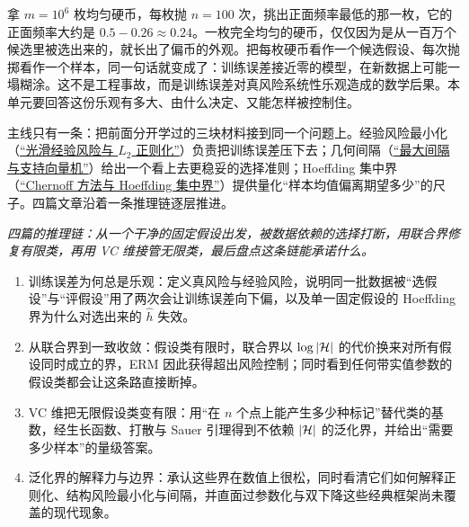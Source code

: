 拿 \(m=10^6\) 枚均匀硬币，每枚抛 \(n=100\) 次，挑出正面频率最低的那一枚，它的正面频率大约是 \(0.5-0.26\approx 0.24\)。一枚完全均匀的硬币，仅仅因为是从一百万个候选里被选出来的，就长出了偏币的外观。把每枚硬币看作一个候选假设、每次抛掷看作一个样本，同一句话就变成了：训练误差接近零的模型，在新数据上可能一塌糊涂。这不是工程事故，而是训练误差对真风险系统性乐观造成的数学后果。本单元要回答这份乐观有多大、由什么决定、又能怎样被控制住。

主线只有一条：把前面分开学过的三块材料接到同一个问题上。经验风险最小化（\hyperref[sec:09-Convex-Optimization/07-Applications/01]{``光滑经验风险与 \(L_2\) 正则化''}）负责把训练误差压下去；几何间隔（\hyperref[sec:09-Convex-Optimization/07-Applications/03]{``最大间隔与支持向量机''}）给出一个看上去更稳妥的选择准则；Hoeffding 集中界（\hyperref[sec:05-Probability/07-Transforms-and-Bounds/04]{``Chernoff 方法与 Hoeffding 集中界''}）提供量化``样本均值偏离期望多少''的尺子。四篇文章沿着一条推理链逐层推进。

\begin{center}
\end{center}

\emph{四篇的推理链：从一个干净的固定假设出发，被数据依赖的选择打断，用联合界修复有限类，再用 VC 维接管无限类，最后盘点这条链能承诺什么。}

\begin{enumerate}
\tightlist
\item
  训练误差为何总是乐观：定义真风险与经验风险，说明同一批数据被``选假设''与``评假设''用了两次会让训练误差向下偏，以及单一固定假设的 Hoeffding 界为什么对选出来的 \(\widehat h\) 失效。
\item
  从联合界到一致收敛：假设类有限时，联合界以 \(\log\left|\mathcal{H}\right|\) 的代价换来对所有假设同时成立的界，ERM 因此获得超出风险控制；同时看到任何带实值参数的假设类都会让这条路直接断掉。
\item
  VC 维把无限假设类变有限：用``在 \(n\) 个点上能产生多少种标记''替代类的基数，经生长函数、打散与 Sauer 引理得到不依赖 \(\left|\mathcal{H}\right|\) 的泛化界，并给出``需要多少样本''的量级答案。
\item
  泛化界的解释力与边界：承认这些界在数值上很松，同时看清它们如何解释正则化、结构风险最小化与间隔，并直面过参数化与双下降这些经典框架尚未覆盖的现代现象。
\end{enumerate}


